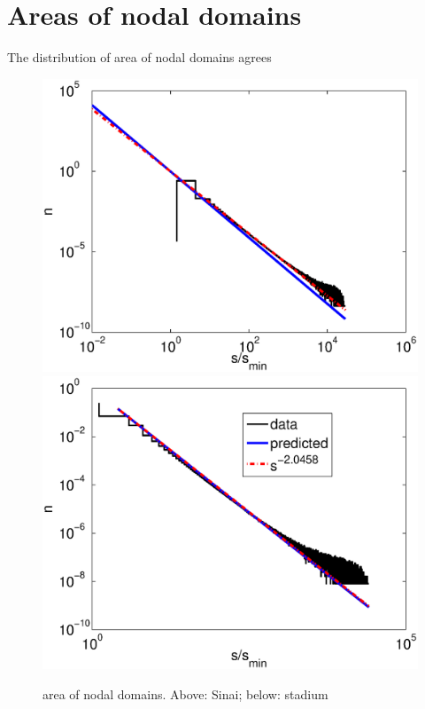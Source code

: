 \documentclass{report}
\begin{document}
\section{Areas of nodal domains}
The distribution of area of nodal domains agrees 
\begin{figure}
  \begin{center}
    \includegraphics[width=\textwidth]{figs/results/qugrs_1000_to_1200_sizes.eps}
    \includegraphics[width=\textwidth]{figs/results/qust_700_to_900_sizes_0.1_sampled.eps}
    \caption{area of nodal domains. Above: Sinai; below: stadium}
    \label{fig:area}
  \end{center}
\end{figure}
\end{document}
